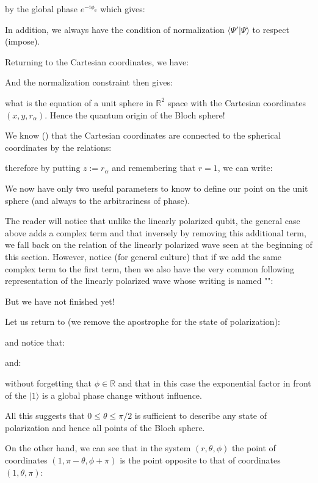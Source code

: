 	by the global phase $e^{-\mathrm{i}\phi_a}$ which gives:
	
	In addition, we always have the condition of normalization $\langle \Psi' | \Psi\rangle$ to respect (impose).
	
	Returning to the Cartesian coordinates, we have:
	
	And the normalization constraint then gives:
	
	what is the equation of a unit sphere in $\mathbb{R}^2$ space with the Cartesian coordinates $(x,y,r_\alpha)$. Hence the quantum origin of the Bloch sphere!
	
	We know () that the Cartesian coordinates are connected to the spherical coordinates by the relations:
	
	therefore by putting $z:=r_\alpha$ and remembering that $r=1$, we can write:
	
	We now have only two useful parameters to know to define our point on the unit sphere (and always to the arbitrariness of phase).
	
	The reader will notice that unlike the linearly polarized qubit, the general case above adds a complex term and that inversely by removing this additional term, we fall back on the relation of the linearly polarized wave seen at the beginning of this section. However, notice (for general culture) that if we add the same complex term to the first term, then we also have the very common following representation of the linearly polarized wave whose writing is named "":
	
	But we have not finished yet!

	Let us return to (we remove the apostrophe for the state of polarization):
	
	and notice that:
	
	and:
	
	without forgetting that $\phi\in\mathbb{R}$ and that in this case the exponential factor in front of the $|1\rangle$ is a global phase change without influence.

	All this suggests that $0\le \theta \le \pi/2 $ is sufficient to describe any state of polarization and hence all points of the Bloch sphere.

	On the other hand, we can see that in the system $(r,\theta,\phi)$ the point of coordinates $(1,\pi-\theta,\phi+\pi)$ is the point opposite to that of coordinates $(1,\theta,\pi)$:
	
